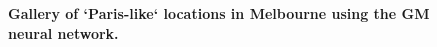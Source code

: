 \documentclass[10pt,letterpaper]{article}
\begin{document}
\begin{figure}[!htbp]
\caption{\bf Gallery of `Paris-like` locations in Melbourne using the GM neural network.}    
 \label{fig:gm_mel_gallery} 
\end{figure} 
\end{document}
